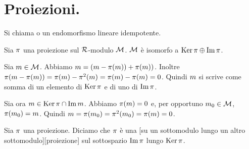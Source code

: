 \section{Proiezioni.}\label{Proiezioni}
\begin{Definition}
	Si chiama  o  un endomorfismo
  lineare idempotente.
\end{Definition}
\begin{Theorem}
	Sia $\Projection$ una proiezione sul $\mathcal{R}$-modulo $\mathcal{M}$. $\mathcal{M}$ \`e isomorfo a $\Kernel{\Projection} \oplus \Image{\Projection}$.
\end{Theorem}
\Proof Sia $m \in \mathcal{M}$. Abbiamo $\ModuleElement = (\ModuleElement - \Projection(\ModuleElement)) + \Projection(\ModuleElement))$. Inoltre $\Projection(\ModuleElement - \Projection(\ModuleElement)) = \Projection(\ModuleElement) - \Projection^2(\ModuleElement) = \Projection(\ModuleElement) - \Projection(\ModuleElement) = 0$. Quindi $m$ si scrive come somma di un elemento di $\Kernel{\Projection}$ e di uno di $\Image{\Projection}$.
\par Sia ora $\ModuleElement \in \Kernel{\Projection} \cap \Image{\ModuleElement}$. Abbiamo $\Projection(\ModuleElement) = 0$ e, per opportuno $m_0 \in \mathcal{M}$, $\Projection(\ModuleElement_0) = \ModuleElement$. Quindi $\ModuleElement = \Projection(\ModuleElement_0) = \Projection^2(\ModuleElement_0) = \Projection(\ModuleElement) = 0$. \EndProof
\begin{Definition}
	Sia $\Projection$ una proiezione. Diciamo che $\Projection$ \`e una [su un sottomodulo lungo un altro sottomodulo][proiezione] sul sottospazio $\Image{\Projection}$ lungo $\Kernel{\Projection}$.
\end{Definition}
